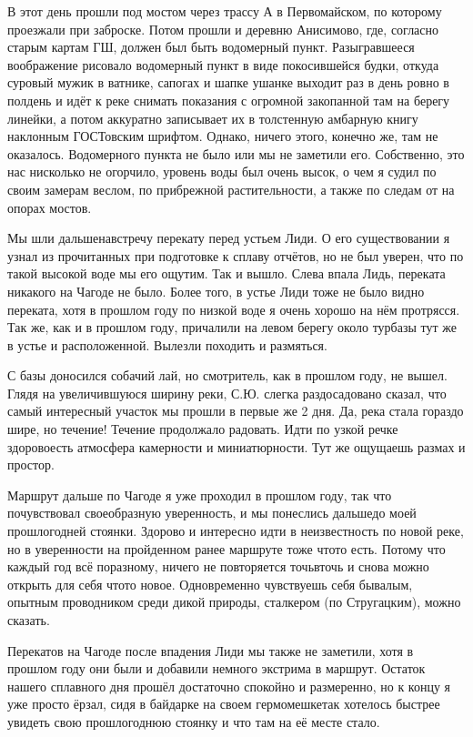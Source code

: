 В этот день прошли под мостом через трассу А в Первомайском, по которому проезжали при заброске. Потом прошли и деревню Анисимово, где, согласно старым картам ГШ, должен был быть водомерный пункт. Разыгравшееся воображение рисовало водомерный пункт в виде покосившейся будки, откуда суровый мужик в ватнике, сапогах и шапке ушанке выходит раз в день ровно в полдень и идёт к реке снимать показания с огромной закопанной там на берегу линейки, а потом аккуратно записывает их в толстенную амбарную книгу наклонным ГОСТ\sdash овским шрифтом. Однако, ничего этого, конечно же, там не оказалось. Водомерного пункта не было или мы не заметили его. Собственно, это нас нисколько не огорчило, уровень воды был очень высок, о чем я судил по своим замерам веслом, по прибрежной растительности, а также по следам от на опорах мостов. 

Мы шли дальше\mdash  навстречу перекату перед устьем Лиди. О его существовании я узнал из прочитанных при подготовке к сплаву отчётов, но не был уверен, что по такой высокой воде мы его ощутим. Так и вышло. Слева впала Лидь, переката никакого на Чагоде не было. Более того, в устье Лиди тоже не было видно переката, хотя в прошлом году по низкой воде я очень хорошо на нём протрясся. Так же, как и в прошлом году, причалили на левом берегу около турбазы тут же в устье и расположенной. Вылезли походить и размяться. 

С базы доносился собачий лай, но смотритель, как в прошлом году, не вышел. Глядя на увеличившуюся ширину реки, С.Ю. слегка раздосадовано сказал, что самый интересный участок мы прошли в первые же 2 дня. Да, река стала гораздо шире, но течение! Течение продолжало радовать. Идти по узкой речке здорово\mdash  есть атмосфера камерности и миниатюрности. Тут же ощущаешь размах и простор.

Маршрут дальше по Чагоде я уже проходил в прошлом году, так что почувствовал своеобразную уверенность, и мы понеслись дальше\mdash  до моей прошлогодней стоянки. Здорово и интересно идти в неизвестность по новой реке, но в уверенности на пройденном ранее маршруте тоже что\sdash то есть. Потому что каждый год всё по\sdash разному, ничего не повторяется точь\sdash в\sdash точь и снова можно открыть для себя что\sdash то новое. Одновременно чувствуешь себя бывалым, опытным проводником среди дикой природы, сталкером (по Стругацким), можно сказать.
 
Перекатов на Чагоде после впадения Лиди мы также не заметили, хотя в прошлом году они были и добавили немного экстрима в маршрут. Остаток нашего сплавного дня прошёл достаточно спокойно и размеренно, но к концу я уже просто ёрзал, сидя в байдарке на своем гермомешке\mdash  так хотелось быстрее увидеть свою прошлогоднюю стоянку и что там на её месте стало. 

